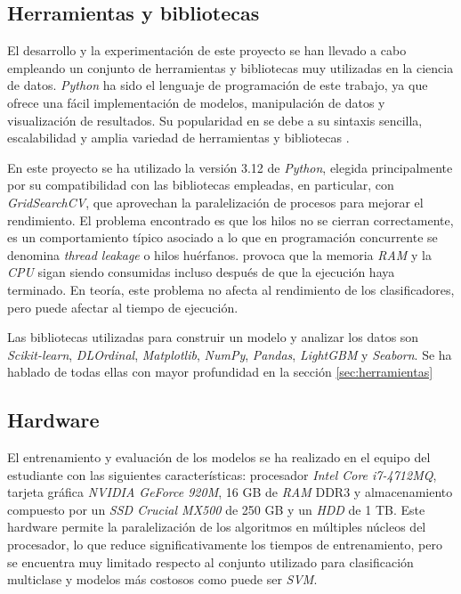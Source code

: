 \subsection{Herramientas y bibliotecas}
\label{subsec:herramientas}

El desarrollo y la experimentación de este proyecto se han llevado a cabo empleando un conjunto de herramientas y bibliotecas muy utilizadas en la ciencia de datos. \textit{Python} ha sido el lenguaje de programación de este trabajo, ya que ofrece una fácil implementación de modelos, manipulación de datos y visualización de resultados. Su popularidad en se debe a su sintaxis sencilla, escalabilidad y amplia variedad de herramientas y bibliotecas \cite{python_ml}.

\vspace{1em}

En este proyecto se ha utilizado la versión 3.12 de \textit{Python}, elegida principalmente por su compatibilidad con las bibliotecas empleadas, en particular, con \textit{GridSearchCV}, que aprovechan la paralelización de procesos para mejorar el rendimiento. El problema encontrado es que los hilos no se cierran correctamente, es un comportamiento típico asociado a lo que en programación concurrente se denomina \textit{thread leakage} o hilos huérfanos. provoca que la memoria \textit{RAM} y la \textit{CPU} sigan siendo consumidas incluso después de que la ejecución haya terminado. En teoría, este problema no afecta al rendimiento de los clasificadores, pero puede afectar al tiempo de ejecución.

\vspace{1em}

Las bibliotecas utilizadas para construir un modelo y analizar los datos son \textit{Scikit-learn}, \textit{DLOrdinal}, \textit{Matplotlib}, \textit{NumPy}, \textit{Pandas}, \textit{LightGBM} y \textit{Seaborn}. Se ha hablado de todas ellas con mayor profundidad en la sección \ref{sec:herramientas}

\subsection{Hardware}
\label{subsec:hw_usado}

El entrenamiento y evaluación de los modelos se ha realizado en el equipo del estudiante con las siguientes características: procesador \textit{Intel Core i7-4712MQ}, tarjeta gráfica \textit{NVIDIA GeForce 920M}, 16 GB de \textit{RAM} DDR3 y almacenamiento compuesto por un \textit{SSD Crucial MX500} de 250 GB y un \textit{HDD} de 1 TB. Este hardware permite la paralelización de los algoritmos en múltiples núcleos del procesador, lo que reduce significativamente los tiempos de entrenamiento, pero se encuentra muy limitado respecto al conjunto utilizado para clasificación multiclase y modelos más costosos como puede ser \textit{SVM}.

